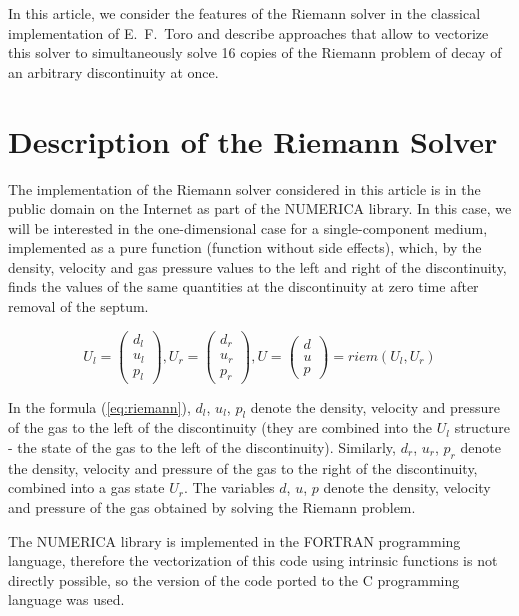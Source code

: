 \documentclass[utf8,english]{psta}%
\begin{document}
In this article, we consider the features of the Riemann solver in the classical implementation of E.~F.~Toro \cite{TorRiemann} and describe approaches that allow to vectorize this solver to simultaneously solve 16 copies of the Riemann problem of decay of an arbitrary discontinuity at once.

\section{Description of the Riemann Solver}

The implementation of the Riemann solver considered in this article is in the public domain on the Internet as part of the NUMERICA \cite{Numerica} library.
In this case, we will be interested in the one-dimensional case for a single-component medium, implemented as a pure function (function without side effects), which, by the density, velocity and gas pressure values to the left and right of the discontinuity, finds the values of the same quantities at the discontinuity at zero time after removal of the septum.

\begin{equation}\label{eq:riemann}
U_l = \left( \begin{array}{ccc} d_l \\ u_l \\ p_l \end{array} \right),
U_r = \left( \begin{array}{ccc} d_r \\ u_r \\ p_r \end{array} \right),
U = \left( \begin{array}{ccc} d \\ u \\ p \end{array} \right) = riem(U_l, U_r)
\end{equation}

In the formula (\ref{eq:riemann}), $d_l$, $u_l$, $p_l$ denote the density, velocity and pressure of the gas to the left of the discontinuity (they are combined into the $U_l$ structure - the state of the gas to the left of the discontinuity).
Similarly, $d_r$, $u_r$, $p_r$ denote the density, velocity and pressure of the gas to the right of the discontinuity, combined into a gas state $U_r$.
The variables $d$, $u$, $p$ denote the density, velocity and pressure of the gas obtained by solving the Riemann problem.

The NUMERICA library is implemented in the FORTRAN programming language, therefore the vectorization of this code using intrinsic functions is not directly possible, so the version of the code ported to the C programming language was used.
\end{document}

